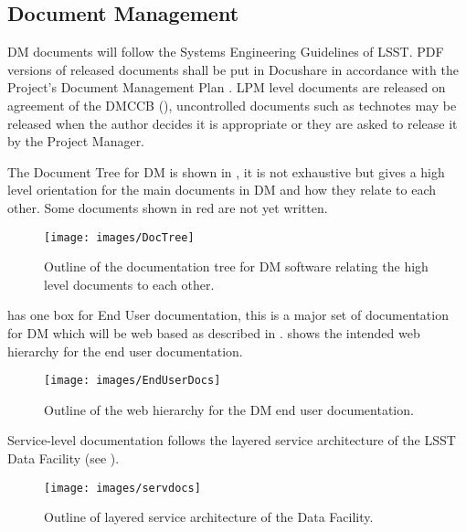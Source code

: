 \subsection {Document Management} \label{sect:docman}

DM documents will follow the Systems Engineering Guidelines of LSST. PDF versions of released documents shall be put in Docushare in accordance with the Project's Document Management Plan . LPM level documents are released on agreement of the DMCCB (), uncontrolled documents such as technotes may be released when the author decides it is appropriate or they are asked to release it by the Project Manager.

The Document Tree for DM is shown in , it is not exhaustive but gives a high level orientation for the main documents in DM and how they relate to each other. Some documents shown in red are not yet written.

\begin{figure}
\begin{center}
 \texttt{[image: images/DocTree]}
\caption{Outline of the documentation tree for DM software relating the high level documents to each other. \label{fig:doctree}}
\end{center}
\end{figure}

 has one box for End User documentation, this is a major set of documentation for DM which will be web based as  described in  .  shows the intended web hierarchy for the end user documentation.

\begin{figure}
\begin{center}
 \texttt{[image: images/EndUserDocs]}
\caption{Outline of the web hierarchy for the DM end user documentation. \label{fig:eudoc}}
\end{center}
\end{figure}



Service-level documentation follows the layered service architecture of the LSST Data Facility (see ).

\begin{figure}
\begin{center}
 \texttt{[image: images/servdocs]}
\caption{Outline of layered service architecture of the Data Facility. \label{fig:servdoc}}
\end{center}
\end{figure}

